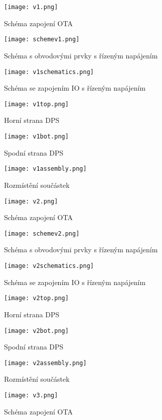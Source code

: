 \begin{figure}[h]
\centering
\texttt{[image: v1.png]}
\caption{Schéma zapojení OTA \label{s:V1}}
\end{figure}
\begin{figure}[h]
\centering
\texttt{[image: schemev1.png]}
\caption{Schéma s obvodovými prvky s řízeným napájením}
\end{figure}
\begin{figure}[h]
\centering
\texttt{[image: v1schematics.png]}
\caption{Schéma se zapojením IO s řízeným napájením}
\end{figure}
\begin{figure}[h]
\centering
\texttt{[image: v1top.png]}
\caption{Horní strana DPS}
\end{figure}
\begin{figure}[h]
\centering
\texttt{[image: v1bot.png]}
\caption{Spodní strana DPS}
\end{figure}
\begin{figure}[h]
\centering
\texttt{[image: v1assembly.png]}
\caption{Rozmístění součástek}
\end{figure}
\begin{figure}[h]
\centering
\texttt{[image: v2.png]}
\caption{Schéma zapojení OTA}
\end{figure}
\begin{figure}[h]
\centering
\texttt{[image: schemev2.png]}
\caption{Schéma s obvodovými prvky s řízeným napájením}
\end{figure}
\begin{figure}[h]
\centering
\texttt{[image: v2schematics.png]}
\caption{Schéma se zapojením IO s řízeným napájením}
\end{figure}
\begin{figure}[h]
\centering
\texttt{[image: v2top.png]}
\caption{Horní strana DPS}
\end{figure}
\begin{figure}[h]
\centering
\texttt{[image: v2bot.png]}
\caption{Spodní strana DPS}
\end{figure}
\begin{figure}[h]
\centering
\texttt{[image: v2assembly.png]}
\caption{Rozmístění součástek}
\end{figure}
\begin{figure}[h]
\centering
\texttt{[image: v3.png]}
\caption{Schéma zapojení OTA}
\end{figure}
